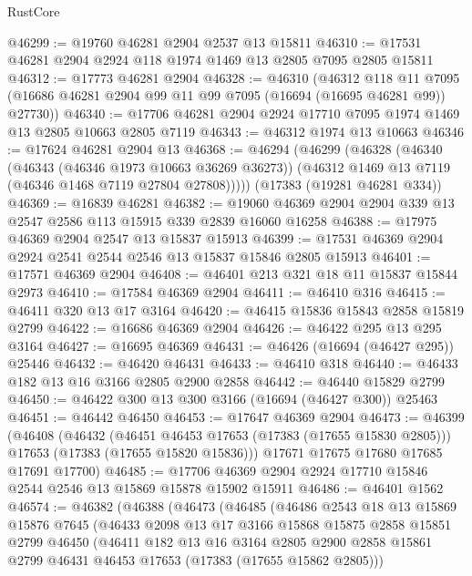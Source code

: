 \begin{lexlean}{RustCore}
\begin{coremodule}
@46299 := @19760 @46281 @2904 @2537 @13 @15811
@46310 := @17531 @46281 @2904 @2924 @118 @1974 @1469 @13 @2805 @7095 @2805 @15811
@46312 := @17773 @46281 @2904
@46328 := @46310
    (@46312
      @118
      @11
      @7095
      (@16686 @46281 @2904 @99 @11 @99 @7095 (@16694 (@16695 @46281 @99)) @27730))
@46340 := @17706 @46281 @2904 @2924 @17710 @7095 @1974 @1469 @13 @2805 @10663 @2805 @7119
@46343 := @46312 @1974 @13 @10663
@46346 := @17624 @46281 @2904 @13
@46368 := @46294
    (@46299
      (@46328
        (@46340
          (@46343 (@46346 @1973 @10663 @36269 @36273))
          (@46312 @1469 @13 @7119 (@46346 @1468 @7119 @27804 @27808)))))
    (@17383 (@19281 @46281 @334))
@46369 := @16839 @46281
@46382 := @19060 @46369 @2904 @2904 @339 @13 @2547 @2586 @113 @15915 @339 @2839 @16060 @16258
@46388 := @17975 @46369 @2904 @2547 @13 @15837 @15913
@46399 := @17531 @46369 @2904 @2924 @2541 @2544 @2546 @13 @15837 @15846 @2805 @15913
@46401 := @17571 @46369 @2904
@46408 := @46401 @213 @321 @18 @11 @15837 @15844 @2973
@46410 := @17584 @46369 @2904
@46411 := @46410 @316
@46415 := @46411 @320 @13 @17 @3164
@46420 := @46415 @15836 @15843 @2858 @15819 @2799
@46422 := @16686 @46369 @2904
@46426 := @46422 @295 @13 @295 @3164
@46427 := @16695 @46369
@46431 := @46426 (@16694 (@46427 @295)) @25446
@46432 := @46420 @46431
@46433 := @46410 @318
@46440 := @46433 @182 @13 @16 @3166 @2805 @2900 @2858
@46442 := @46440 @15829 @2799
@46450 := @46422 @300 @13 @300 @3166 (@16694 (@46427 @300)) @25463
@46451 := @46442 @46450
@46453 := @17647 @46369 @2904
@46473 := @46399
    (@46408
      (@46432
        (@46451 @46453 @17653 (@17383 (@17655 @15830 @2805)))
        @17653
        (@17383 (@17655 @15820 @15836)))
      @17671
      @17675
      @17680
      @17685
      @17691
      @17700)
@46485 := @17706 @46369 @2904 @2924 @17710 @15846 @2544 @2546 @13 @15869 @15878 @15902 @15911
@46486 := @46401 @1562
@46574 := @46382
    (@46388
      (@46473
        (@46485
          (@46486
            @2543
            @18
            @13
            @15869
            @15876
            @7645
            (@46433
              @2098
              @13
              @17
              @3166
              @15868
              @15875
              @2858
              @15851
              @2799
              @46450
              (@46411
                @182
                @13
                @16
                @3164
                @2805
                @2900
                @2858
                @15861
                @2799
                @46431
                @46453
                @17653
                (@17383 (@17655 @15862 @2805)))

\end{coremodule}
\end{lexlean}
